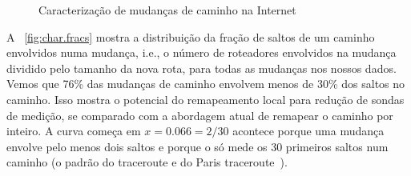 \begin{figure}[t]
\vspace{-1em}
\begin{center}
\hspace{2mm}
\vspace{-0.7em}
\caption{Caracterização de mudanças de caminho na Internet}
\label{fig:char}
\vspace{-0.4em}
\end{center}
\end{figure}

A \figstr~\ref{fig:char.fracs} mostra a distribuição da fração de saltos
de um caminho envolvidos numa mudança, i.e., o número de roteadores
envolvidos na mudança dividido pelo tamanho da nova rota, para todas as
mudanças nos nossos dados.  Vemos que 76\% das mudanças de caminho
envolvem menos de 30\% dos saltos no caminho.  Isso mostra o potencial
do remapeamento local para redução de sondas de medição, se comparado
com a abordagem atual de remapear o caminho por inteiro.  A curva começa
em $x = 0.066 = 2/30$ acontece porque uma mudança envolve pelo menos
dois saltos e porque o \dtrack{} só mede os 30 primeiros saltos num
caminho (o padrão do traceroute e do Paris
traceroute~\cite{jacobson1989traceroute, augustin07}).

